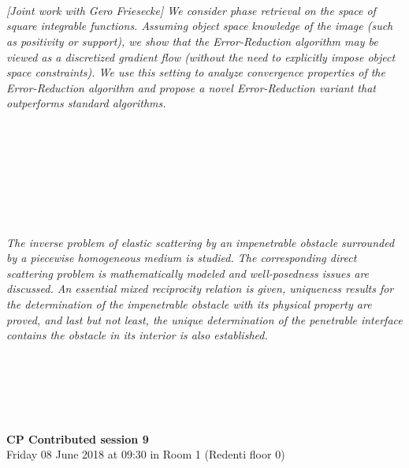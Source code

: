 \begin{multicols}{2}
      \\\\
\\
    \textit{[Joint work with Gero Friesecke] We consider phase retrieval on the space of square integrable functions. Assuming object space knowledge of the image (such as positivity or support), we show that the Error-Reduction algorithm may be viewed as a discretized gradient flow (without the need to explicitly impose object space constraints). We use this setting to analyze convergence properties of the Error-Reduction algorithm and propose a novel Error-Reduction variant that outperforms standard algorithms.}\\
\\ 
      \\
      \\\\
      \\
      \\\\
\\
    \textit{The inverse problem of elastic scattering by an impenetrable obstacle surrounded by a piecewise homogeneous medium is studied. The corresponding direct scattering problem is mathematically modeled and well-posedness issues are discussed. An essential mixed reciprocity relation is given, uniqueness results for the determination of the impenetrable obstacle with its physical property are proved, and last but not least, the unique determination of the penetrable interface contains the obstacle in its interior is also established.     
 }\\
\\ 
      \\
      \\\\
\\
  \end{multicols}
  \noindent\textbf{CP Contributed session 9}\\
    Friday 08 June 2018 at 09:30 in Room 1 (Redenti floor 0)  \\
  \textit{} \\
    
